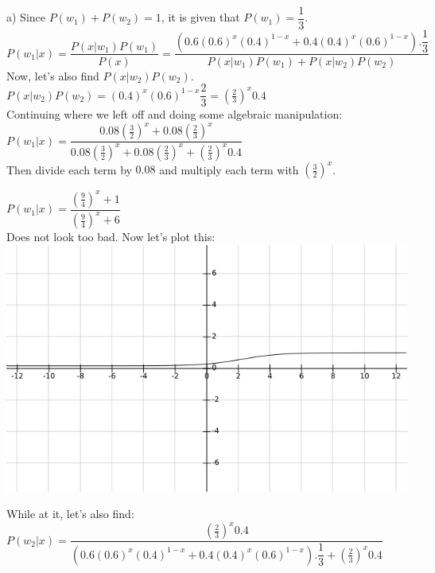 \documentclass[12pt]{article}
\begin{document}
a) Since $P(w_1)+P(w_2)=1$, it is given that $P(w_1)=\dfrac{1}{3}$. \\


$P(w_1|x) = \dfrac{P(x|w_1)P(w_1)}{P(x)} = \dfrac{(0.6 (0.6)^x(0.4)^{1-x} + 0.4(0.4)^x(0.6)^{1-x}).\dfrac{1}{3}}{P(x|w_1)P(w_1)+P(x|w_2)P(w_2)} $ \\

Now, let's also find $P(x|w_2)P(w_2)$. \\

$P(x|w_2)P(w_2) = (0.4)^x(0.6)^{1-x} \dfrac{2}{3} =(\frac{2}{3})^x0.4 $ \\

Continuing where we left off and doing some algebraic manipulation: \\

$P(w_1|x) = \dfrac{0.08 (\frac{3}{2})^x + 0.08(\frac{2}{3})^x}{0.08 (\frac{3}{2})^x + 0.08(\frac{2}{3})^x+(\frac{2}{3})^x0.4} $ \\

Then divide each term by $0.08$ and multiply each term with $(\frac{3}{2})^x$.

$P(w_1|x) = \dfrac{(\frac{9}{4})^x + 1}{(\frac{9}{4})^x + 6} $ \\

Does not look too bad. Now let's plot this: \\

\includegraphics[scale=0.95]{q2.png}

While at it, let's also find: \\

$ P(w_2|x) = \dfrac{(\frac{2}{3})^x0.4}{ (0.6 (0.6)^x(0.4)^{1-x} + 0.4(0.4)^x(0.6)^{1-x}).\dfrac{1}{3} + (\frac{2}{3})^x0.4}  $ \\
\end{document}

